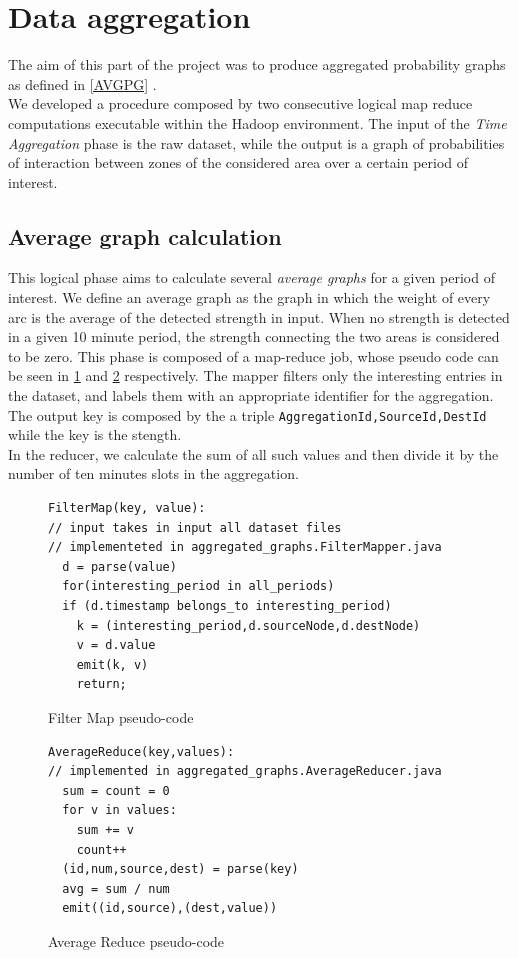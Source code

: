 \section{Data aggregation}
\label{aggregation}
The aim of this part of the project was to produce aggregated probability graphs as defined in \ref{AVGPG} .
\\ 
We developed a procedure composed by two consecutive logical map reduce computations executable within the Hadoop environment.
The input of the \emph{Time Aggregation} phase is the raw dataset, while the output is a graph of probabilities of interaction between zones of the considered area
over a certain period of interest.
\subsection{Average graph calculation}
This logical phase aims to calculate several \emph{average graphs} for a given period of interest.
We define an average graph as the graph in which the weight of every arc is the average of the detected strength in input. When no strength is detected in a given 10 minute period, the strength connecting the two areas is considered to be zero.
This phase is composed of a map-reduce job, whose pseudo code can be seen in \ref{fig:filtermap} and \ref{fig:averagereduce} respectively.
The mapper filters only the interesting entries in the dataset, and labels them with an appropriate identifier for the aggregation. The output key is composed by the  a triple \texttt{AggregationId,SourceId,DestId} while the key is the stength.\\
In the reducer, we calculate the sum of all such values and then divide it by the number of ten minutes slots in the aggregation.

\begin{figure}
\begin{verbatim}
FilterMap(key, value):
// input takes in input all dataset files
// implementeted in aggregated_graphs.FilterMapper.java
  d = parse(value)
  for(interesting_period in all_periods)
  if (d.timestamp belongs_to interesting_period)
  	k = (interesting_period,d.sourceNode,d.destNode)
  	v = d.value
    emit(k, v)
    return;
\end{verbatim}
\caption{Filter Map pseudo-code}
\label{fig:filtermap}
\end{figure}
\begin{figure}
\begin{verbatim}
AverageReduce(key,values):
// implemented in aggregated_graphs.AverageReducer.java
  sum = count = 0
  for v in values:
  	sum += v
  	count++
  (id,num,source,dest) = parse(key)
  avg = sum / num
  emit((id,source),(dest,value))
\end{verbatim}
\caption{Average Reduce pseudo-code}
\label{fig:averagereduce}
\end{figure} 

